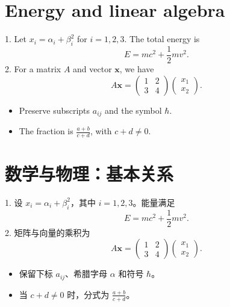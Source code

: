 \documentclass[14pt]{extarticle}
\begin{document}
\section*{Energy and linear algebra}
1. Let $x_i=\alpha_i+\beta_i^2$ for $i=1,2,3$. The total energy is
\begin{equation}
 E = mc^2 + \frac{1}{2}mv^2 .
\end{equation}
2. For a matrix $A$ and vector $\mathbf{x}$, we have
\begin{equation}
 A\mathbf{x}=\begin{pmatrix}1&2\\3&4\end{pmatrix}\begin{pmatrix}x_1\\x_2\end{pmatrix}.
\end{equation}
\begin{itemize}
\item Preserve subscripts $a_{ij}$ and the symbol $\hbar$.
\item The fraction is $\frac{a+b}{c+d}$, with $c+d\ne0$.
\end{itemize}
\newpage
\section*{数学与物理：基本关系}
1. 设 $x_i=\alpha_i+\beta_i^2$，其中 $i=1,2,3$。能量满足
\begin{equation}
 E=mc^2+\frac{1}{2}mv^2 .
\end{equation}
2. 矩阵与向量的乘积为
\begin{equation}
 A\mathbf{x}=\begin{pmatrix}1&2\\3&4\end{pmatrix}\begin{pmatrix}x_1\\x_2\end{pmatrix}.
\end{equation}
\begin{itemize}
\item 保留下标 $a_{ij}$、希腊字母 $\alpha$ 和符号 $\hbar$。
\item 当 $c+d\ne0$ 时，分式为 $\frac{a+b}{c+d}$。
\end{itemize}
\end{document}
